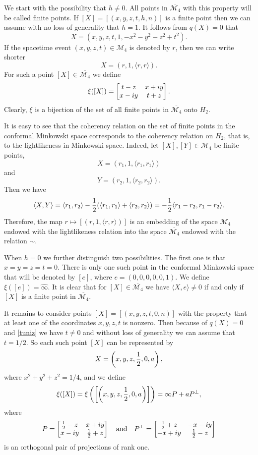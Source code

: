 \documentclass[10pt,a4paper]{amsart}
\providecommand{\index}[1]{}
\newcommand\oi{{\widehat{\infty}}}
\theoremstyle{definition}
\theoremstyle{remark}
\numberwithin{subsection}{section}
\numberwithin{equation}{section}
\begin{document}
We start with the possibility that $h \not = 0$. All points in $\overline{ \mathcal{M}_4 }$ with this property will be called finite points\index{finite point}.
If  $[X] = [ (x,y,z,t,h,n) ]$  is a finite point
then we can assume with no loss of generality that $h=1$. It follows from $q(X) = 0$ that
\[
X =  (x,y,z,t,1,  -x^2 -y^2-z^2 + t^2).
\]
If the spacetime event $(x,y,z,t)\in \mathcal{M}_4$ is denoted by $r$, then we can write shorter
\[
X = (r,1, \langle r,r \rangle).
\]
For such a point $[X] \in \overline{ \mathcal{M}_4 }$ we define
\[
\xi ([X]) =  \left[ \begin{matrix}  t-z & x+iy \cr x-iy & t+z \cr\end{matrix} \right].
\]
Clearly, $\xi$ is a bijection of the set of all finite points in  $\overline{ \mathcal{M}_4 }$ onto $H_2$. 

It is easy to see that the coherency relation on the set of finite points in the conformal Minkowski space corresponds to the coherency relation on $H_2$, that is, to the lightlikeness in Minkowski space. 
Indeed, let $[X], [Y] \in \overline{ \mathcal{M}_4 }$ be finite points,
\[
X =  (r_1,1, \langle r_1,r_1 \rangle)
\]
and
\[
Y =  (r_2,1, \langle r_2,r_2 \rangle).
\]
Then
we have 
\[
\langle X, Y \rangle  =  \langle r_1 , r_2 \rangle -{1 \over 2} ( \langle r_1,r_1 \rangle +  \langle r_2,r_2 \rangle) = -{1 \over 2} \langle r_1-r_2,r_1-r_2 \rangle.
\]
Therefore, the map $r\mapsto  [(r,1, \langle r,r \rangle)]$ is an embedding of the space $\mathcal{M}_4$ endowed with the lightlikeness relation into the space $\overline{\mathcal{M}_4}$ endowed with the relation $\sim$.

When $h=0$ we further distinguish two possibilities. The first one is that $x=y=z=t=0$. There is only one such point in the conformal Minkowski space that will be denoted by $[e]$, where $e = (0,0,0,0,0,1)$. \index{$e$}
We define $\xi ([e]) = {\oi}$. It is clear that for $[X] \in \overline{ \mathcal{M}_4 }$ we have $\langle X, e \rangle \not= 0$ if and only if $[X]$ is a finite point in $\overline{ \mathcal{M}_4 }$.

It remains to consider points $[X] = [(x,y,z,t,0,n)]$ with the property that at least one of the coordinates $x,y,z,t$ is nonzero. Then because of $q(X) = 0$ and \eqref{tuniz} we have $t\not=0$ and without loss of generality we can assume that $t=1/2$. So each such point $[X]$ can be represented by
\begin{equation}\label{musi}
X =\left(x,y,z, {1 \over 2}, 0 , a \right) ,
\end{equation}
where $x^2 + y^2 + z^2 = 1/4$, 
and we define
\[
\xi ([X]) = \xi \left( \left[ \left(x,y,z, {1 \over 2}, 0 , a \right) \right] \right) = \infty P + aP^\perp,
\]
where 
\[
P = \left[ \begin{matrix}  {1 \over 2} -z & x+iy \cr x-iy & {1 \over 2} +z \cr\end{matrix} \right] \ \ \ \text{and} \  \ \ 
P^\perp = \left[ \begin{matrix}  {1 \over 2}   + z & -x-iy \cr -x+ iy & {1 \over 2} - z \cr\end{matrix} \right]
\]
is an orthogonal pair of projections of rank one.
\end{document}
